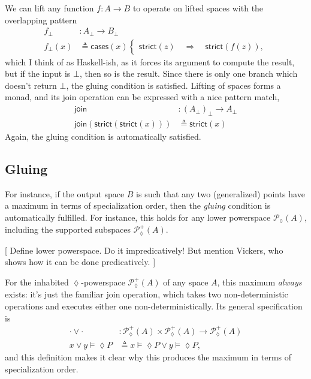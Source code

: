 \documentclass[conference]{IEEEtran}
\newcommand{\PLower}{\mathcal{P}_\lozenge}
\newcommand{\Branch}{\Rightarrow}
\begin{document}
We can lift any function $f : A \to B$ to operate on lifted spaces with the overlapping pattern
\begin{align*}
f_\bot &: A_\bot \to B_\bot
\\ f_\bot(x) &\triangleq
  \mathsf{cases}(x)
  \begin{cases}
  \mathsf{strict}(z) \quad \Branch \quad \mathsf{strict}(f(z)),
  \end{cases}
\end{align*}
which I think of as Haskell-ish, as it forces its argument to compute the result, but if the input is $\bot$, then so is the result. Since there is only one branch which doesn't return $\bot$, the gluing condition is satisfied. Lifting of spaces forms a monad, and its join operation can be expressed with a nice pattern match,
\begin{align*}
\mathsf{join} &: \left( A_\bot \right)_\bot \to A_\bot
\\ \mathsf{join}(\mathsf{strict}(\mathsf{strict}(x))) &\triangleq \mathsf{strict}(x)
\end{align*}
Again, the gluing condition is automatically satisfied.

\subsection{Gluing}

For instance, if the output space $B$ is such that any two (generalized) points have a maximum in terms of specialization order, then the \emph{gluing} condition is automatically fulfilled. For instance, this holds for any lower powerspace $\PLower(A)$, including the supported subspaces $\PLower^+(A)$.

[ Define lower powerspace. Do it impredicatively! But mention Vickers, who shows how it can be done predicatively. ]

For the inhabited $\lozenge$-powerspace $\PLower^+(A)$ of any space $A$, this maximum \emph{always} exists: it's just the familiar join operation, which takes two non-deterministic operations and executes either one non-deterministically. Its general specification is
\begin{align*}
\cdot \vee \cdot &: \PLower^+(A) \times \PLower^+(A) \to \PLower^+(A)
\\ x \vee y \models \lozenge P &\triangleq x \models \lozenge P \vee y \models \lozenge P,
\end{align*}
and this definition makes it clear why this produces the maximum in terms of specialization order.
\end{document}
